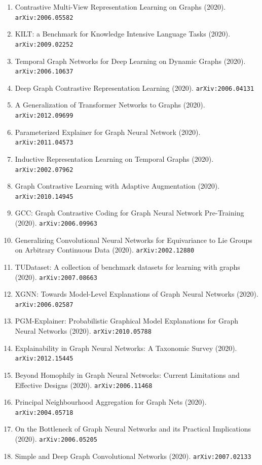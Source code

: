\documentclass[11pt]{article}
\begin{document}
\begin{enumerate}
  \item Contrastive Multi-View Representation Learning on Graphs (2020). \texttt{arXiv:2006.05582}
  \item KILT: a Benchmark for Knowledge Intensive Language Tasks (2020). \texttt{arXiv:2009.02252}
  \item Temporal Graph Networks for Deep Learning on Dynamic Graphs (2020). \texttt{arXiv:2006.10637}
  \item Deep Graph Contrastive Representation Learning (2020). \texttt{arXiv:2006.04131}
  \item A Generalization of Transformer Networks to Graphs (2020). \texttt{arXiv:2012.09699}
  \item Parameterized Explainer for Graph Neural Network (2020). \texttt{arXiv:2011.04573}
  \item Inductive Representation Learning on Temporal Graphs (2020). \texttt{arXiv:2002.07962}
  \item Graph Contrastive Learning with Adaptive Augmentation (2020). \texttt{arXiv:2010.14945}
  \item GCC: Graph Contrastive Coding for Graph Neural Network Pre-Training (2020). \texttt{arXiv:2006.09963}
  \item Generalizing Convolutional Neural Networks for Equivariance to Lie
  Groups on Arbitrary Continuous Data (2020). \texttt{arXiv:2002.12880}
  \item TUDataset: A collection of benchmark datasets for learning with graphs (2020). \texttt{arXiv:2007.08663}
  \item XGNN: Towards Model-Level Explanations of Graph Neural Networks (2020). \texttt{arXiv:2006.02587}
  \item PGM-Explainer: Probabilistic Graphical Model Explanations for Graph
  Neural Networks (2020). \texttt{arXiv:2010.05788}
  \item Explainability in Graph Neural Networks: A Taxonomic Survey (2020). \texttt{arXiv:2012.15445}
  \item Beyond Homophily in Graph Neural Networks: Current Limitations and
  Effective Designs (2020). \texttt{arXiv:2006.11468}
  \item Principal Neighbourhood Aggregation for Graph Nets (2020). \texttt{arXiv:2004.05718}
  \item On the Bottleneck of Graph Neural Networks and its Practical
  Implications (2020). \texttt{arXiv:2006.05205}
  \item Simple and Deep Graph Convolutional Networks (2020). \texttt{arXiv:2007.02133}

\end{enumerate}
\end{document}
